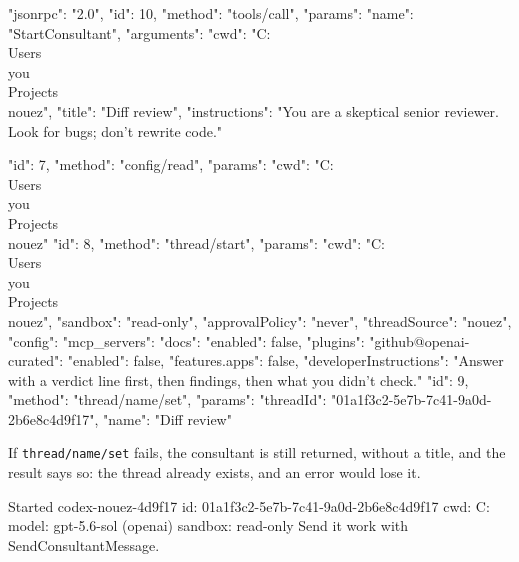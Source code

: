 \documentclass[10pt,a4paper]{article}
\newcommand{\code}[1]{\texttt{#1}}
\begin{document}
\begin{wire}[Request]
{"jsonrpc": "2.0", "id": 10, "method": "tools/call", "params": {"name": "StartConsultant",
  "arguments": {"cwd": "C:\\Users\\you\\Projects\\nouez", "title": "Diff review",
                "instructions": "You are a skeptical senior reviewer. Look for bugs; don't rewrite code."}}}
\end{wire}
\begin{wire}
{"id": 7, "method": "config/read", "params": {"cwd": "C:\\Users\\you\\Projects\\nouez"}}
{"id": 8, "method": "thread/start", "params": {
  "cwd": "C:\\Users\\you\\Projects\\nouez", "sandbox": "read-only", "approvalPolicy": "never",
  "threadSource": "nouez",
  "config": {"mcp_servers": {"docs": {"enabled": false}}, "plugins": {"github@openai-curated": {"enabled": false}},
             "features.apps": false},
  "developerInstructions": "Answer with a verdict line first, then findings, then what you didn't check."}}
{"id": 9, "method": "thread/name/set", "params": {"threadId": "01a1f3c2-5e7b-7c41-9a0d-2b6e8c4d9f17", "name": "Diff review"}}
\end{wire}
If \code{thread/name/set} fails, the consultant is still returned, without a title, and the result says
so: the thread already exists, and an error would lose it.
\begin{plain}
Started codex-nouez-4d9f17
    id: 01a1f3c2-5e7b-7c41-9a0d-2b6e8c4d9f17
    cwd: C:\Users\you\Projects\nouez
    model: gpt-5.6-sol (openai)
    sandbox: read-only
Send it work with SendConsultantMessage.
\end{plain}
\end{document}
